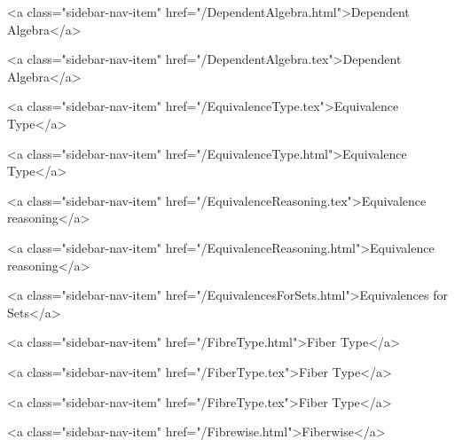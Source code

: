       
    
      
        
          <a class="sidebar-nav-item" href="/DependentAlgebra.html">Dependent Algebra</a>
        
      
    
      
        
          <a class="sidebar-nav-item" href="/DependentAlgebra.tex">Dependent Algebra</a>
        
      
    
      
        
          <a class="sidebar-nav-item" href="/EquivalenceType.tex">Equivalence Type</a>
        
      
    
      
        
          <a class="sidebar-nav-item" href="/EquivalenceType.html">Equivalence Type</a>
        
      
    
      
        
          <a class="sidebar-nav-item" href="/EquivalenceReasoning.tex">Equivalence reasoning</a>
        
      
    
      
        
          <a class="sidebar-nav-item" href="/EquivalenceReasoning.html">Equivalence reasoning</a>
        
      
    
      
        
          <a class="sidebar-nav-item" href="/EquivalencesForSets.html">Equivalences for Sets</a>
        
      
    
      
        
          <a class="sidebar-nav-item" href="/FibreType.html">Fiber Type</a>
        
      
    
      
        
          <a class="sidebar-nav-item" href="/FiberType.tex">Fiber Type</a>
        
      
    
      
        
          <a class="sidebar-nav-item" href="/FibreType.tex">Fiber Type</a>
        
      
    
      
        
          <a class="sidebar-nav-item" href="/Fibrewise.html">Fiberwise</a>
        
